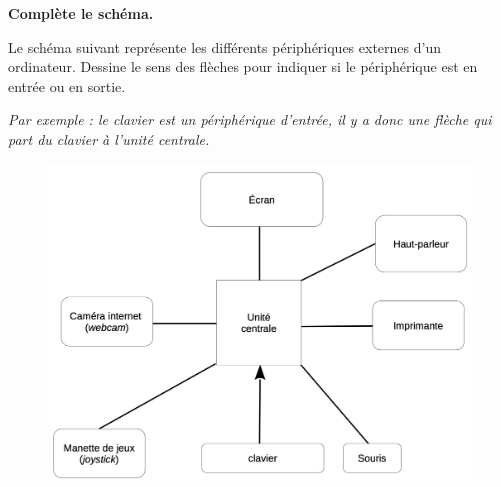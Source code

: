 \documentclass[11pt, a4paper]{book}
\begin{document}
\begin{exercice}
{\bf Complète le schéma.}

Le schéma suivant représente les différents périphériques externes d’un ordinateur. Dessine le sens des flèches pour indiquer si le périphérique est en entrée ou en sortie.

{\it Par exemple : le clavier est un périphérique d’entrée, il y a donc une flèche qui part du clavier à l’unité centrale.}

\begin{figure}[h!]
\centering
	\includegraphics[width=14cm]{images/ordinateur_ex_3}
\end{figure}
\end{exercice}
\end{document}
